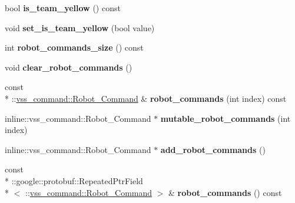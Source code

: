 \begin{DoxyCompactItemize}
\item 
\hypertarget{classvss__command_1_1Global__Commands_a82e8f2fd24d0bcbf30e924d18dd8bba8}{bool {\bfseries is\-\_\-team\-\_\-yellow} () const }\label{classvss__command_1_1Global__Commands_a82e8f2fd24d0bcbf30e924d18dd8bba8}

\item 
\hypertarget{classvss__command_1_1Global__Commands_ac7855fe013be0c1be3f573a1b6eb47dc}{void {\bfseries set\-\_\-is\-\_\-team\-\_\-yellow} (bool value)}\label{classvss__command_1_1Global__Commands_ac7855fe013be0c1be3f573a1b6eb47dc}

\item 
\hypertarget{classvss__command_1_1Global__Commands_a09f12589e89e8d27a0e0d6fb7ecbcee3}{int {\bfseries robot\-\_\-commands\-\_\-size} () const }\label{classvss__command_1_1Global__Commands_a09f12589e89e8d27a0e0d6fb7ecbcee3}

\item 
\hypertarget{classvss__command_1_1Global__Commands_a2624ae56ed92fe0cf6617f8c740ad2d2}{void {\bfseries clear\-\_\-robot\-\_\-commands} ()}\label{classvss__command_1_1Global__Commands_a2624ae56ed92fe0cf6617f8c740ad2d2}

\item 
\hypertarget{classvss__command_1_1Global__Commands_aa6bd99500ef874f4a68cbf1adecf0fd1}{const \\*
\-::\hyperlink{classvss__command_1_1Robot__Command}{vss\-\_\-command\-::\-Robot\-\_\-\-Command} \& {\bfseries robot\-\_\-commands} (int index) const }\label{classvss__command_1_1Global__Commands_aa6bd99500ef874f4a68cbf1adecf0fd1}

\item 
\hypertarget{classvss__command_1_1Global__Commands_a08dc88b20105318b2cc8bbbbf2300581}{inline\-::vss\-\_\-command\-::\-Robot\-\_\-\-Command $\ast$ {\bfseries mutable\-\_\-robot\-\_\-commands} (int index)}\label{classvss__command_1_1Global__Commands_a08dc88b20105318b2cc8bbbbf2300581}

\item 
\hypertarget{classvss__command_1_1Global__Commands_add6abc22ca67ffa146cfba3e0b17ad2b}{inline\-::vss\-\_\-command\-::\-Robot\-\_\-\-Command $\ast$ {\bfseries add\-\_\-robot\-\_\-commands} ()}\label{classvss__command_1_1Global__Commands_add6abc22ca67ffa146cfba3e0b17ad2b}

\item 
\hypertarget{classvss__command_1_1Global__Commands_acb14464615fbad56ce9a1da3ce46373a}{const \\*
\-::google\-::protobuf\-::\-Repeated\-Ptr\-Field\\*
$<$ \-::\hyperlink{classvss__command_1_1Robot__Command}{vss\-\_\-command\-::\-Robot\-\_\-\-Command} $>$ \& {\bfseries robot\-\_\-commands} () const }\label{classvss__command_1_1Global__Commands_acb14464615fbad56ce9a1da3ce46373a}


\end{DoxyCompactItemize}
